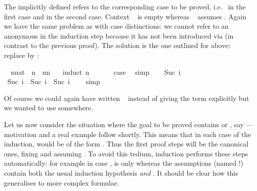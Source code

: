 \begin{isabellebody}
\isamarkupfalse%
\isamarkupfalse%
%
\begin{isamarkuptext}%
\noindent The implicitly defined  refers to the
corresponding case to be proved, i.e.\  in the first case and
 in the second case. Context ~ is
empty whereas ~ assumes . Again we
have the same problem as with case distinctions: we cannot refer to an anonymous 
in the induction step because it has not been introduced via 
(in contrast to the previous proof). The solution is the one outlined for
 above: replace  by :%
\end{isamarkuptext}%
\isamarkuptrue%
\ \ n{\isacharcolon}{\isacharcolon}nat\ \ {\isachardoublequote}n\ {\isacharless}\ n{\isacharasterisk}n\ {\isacharplus}\ {}{\isachardoublequote}\isanewline
\isamarkupfalse%
\ {\isacharparenleft}induct\ n{\isacharparenright}\isanewline
\ \ \isamarkupfalse%
\ {}\ \isamarkupfalse%
\ {\isacharquery}case\ \isamarkupfalse%
\ simp\isanewline
\isamarkupfalse%
\isanewline
\ \ \isamarkupfalse%
\ {\isacharparenleft}Suc\ i{\isacharparenright}\ \isamarkupfalse%
\ {\isachardoublequote}Suc\ i\ {\isacharless}\ Suc\ i\ {\isacharasterisk}\ Suc\ i\ {\isacharplus}\ {}{\isachardoublequote}\ \isamarkupfalse%
\ simp\isanewline
\isamarkupfalse%
\isamarkupfalse%
%
\begin{isamarkuptext}%
\noindent Of course we could again have written
~ instead of giving the term explicitly
but we wanted to use  somewhere.%
\end{isamarkuptext}%
\isamarkuptrue%
%
\isamarkuptrue%
%
\begin{isamarkuptext}%
Let us now consider the situation where the goal to be proved contains
\isa{{\isasymAnd}} or \isa{{\isasymLongrightarrow}}, say  --- motivation and a
real example follow shortly.  This means that in each case of the induction,
 would be of the form .  Thus the
first proof steps will be the canonical ones, fixing  and assuming
. To avoid this tedium, induction performs these steps
automatically: for example in case ,  is only
 whereas the assumptions (named !) contain both the
usual induction hypothesis \emph{and} .
It should be clear how this generalises to more complex formulae.


\end{isamarkuptext}
\end{isabellebody}
